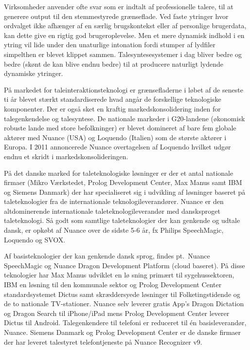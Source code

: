 \begin{multicols}{2}

Virksomheder anvender ofte svar som er indtalt af professionelle talere, til at generere output til den stemmestyrede gr\ae nseflade. Ved faste ytringer hvor ordvalget ikke afh\ae nger af en s\ae rlig brugskontekst eller af personlige brugerdata, kan dette give en rigtig god brugeroplevelse. Men et mere dynamisk indhold i en ytring vil lide under den unaturlige intonation fordi stumper af lydfiler simpelthen er blevet klippet sammen. Talesyntesesystemer i dag bliver bedre og bedre (sk\o nt de kan blive endnu bedre) til at producere naturligt lydende dynamiske ytringer.

\mbox{P\aa} markedet for taleinteraktionsteknologi er gr\ae nsefladerne i l\o bet af de seneste ti \aa r blevet st\ae rkt standardiserede hvad ang\aa r de forskellige teknologiske komponenter. Der er \mbox{ogs\aa} sket en kraftig markedskonsoli\-dering inden for talegenkendelse og talesyntese. De nationale markeder i G20-landene  (\o konomisk robuste lande med store befolkninger) er blevet domineret af bare fem globale akt\o rer med Nuance (USA) og Loquendo (Italien) som de st\o rste akt\o rer i Europa. I 2011 annoncerede Nuance overtagelsen af Loquendo hvilket udg\o r endnu et skridt i markedskonsolideringen. 

\mbox{P\aa} det danske marked for taleteknologiske l\o sninger er der
et antal nationale firmaer (Mikro V\ae rkstedet, Prolog Development
Center, Max Manus samt IBM og Siemens Danmark) der har specialiseret
sig i udvikling af l\o sninger baseret \mbox{p\aa} taleteknologier fra
de internationale teknologileverand\o rer. Nuance er den
altdominerende internationale taleteknologileverand\o r med
dansksproget taleteknologi. \mbox{S\aa} godt som samtlige
taleteknologier der kan genkende og udtale dansk, er opk\o bt af
Nuance over de sidste 5-6 \aa r, fx Philips SpeechMagic, Loquendo og
SVOX.

Af basisteknologier der kan genkende dansk sprog, findes pt.\ Nuance
SpeechMagic og Nuance Dragon Development Platform (cloud
baseret). \mbox{P\aa} disse teknologier har Max Manus udviklet en l\o
sning prim\ae rt til sygehussektoren, IBM en l\o sning til den
kommunale sektor og Prolog Development Center standardsystemet Dictus
samt skr\ae ddersyede l\o sninger til Folketingstidende og de to
nationale TV-stationer. Nuance selv leverer gratis App's Dragon
Dictation og Dragon Search til iPhone/iPad mens Prolog Development
Center leverer Dictus til Android. Talegenkendere til telefoni er
reduceret til \'{e}n basisleverand\o r, Nuance. Siemens Danmark og
Prolog Development Center er de danske firmaer der har leveret
talestyret telefontjeneste \mbox{p\aa} Nuance Recognizer v9.


\end{multicols}
